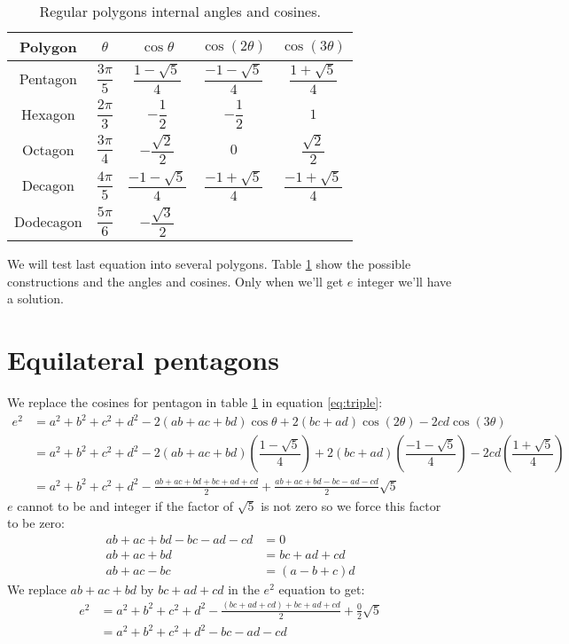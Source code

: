 \documentclass[11pt]{article}
\begin{document}
\begin{table}[h]
\centering
\begin{tabular}{|c c c c c|}\hline
Polygon & $\theta$ & $\cos\theta$ & $\cos(2\theta)$ & $\cos(3\theta)$ \rule[-2ex]{0pt}{6ex}\\ \hline\hline 
Pentagon & $\dfrac{3\pi}{5}$ & $\dfrac{1-\sqrt{5}}{4}$ & $\dfrac{-1-\sqrt{5}}{4}$ & $\dfrac{1+\sqrt{5}}{4}$\rule[-2ex]{0pt}{6ex}\\ \hline
Hexagon & $\dfrac{2\pi}{3}$ & $-\dfrac{1}{2}$ & $-\dfrac{1}{2}$ & $1$ \rule[-2ex]{0pt}{6ex}\\ \hline
Octagon & $\dfrac{3\pi}{4}$ & $-\dfrac{\sqrt{2}}{2}$ & $0$ & $\dfrac{\sqrt{2}}{2}$ \rule[-2ex]{0pt}{6ex}\\ \hline
Decagon & $\dfrac{4\pi}{5}$ & $\dfrac{-1-\sqrt{5}}{4}$ & $\dfrac{-1+\sqrt{5}}{4}$ & $\dfrac{-1+\sqrt{5}}{4}$ \rule[-2ex]{0pt}{6ex}\\ \hline
Dodecagon & $\dfrac{5\pi}{6}$ & $-\dfrac{\sqrt{3}}{2}$ &  & \rule[-2ex]{0pt}{6ex}\\ \hline

\end{tabular}
\caption{Regular polygons internal angles and cosines.}
\label{tbl:polygons}
\end{table}

We will test last equation into several polygons. Table \ref{tbl:polygons}
show the possible constructions and the angles and cosines.
Only when we'll get $e$ integer we'll have a solution.

\section{Equilateral pentagons}

We replace the cosines for pentagon in table \ref{tbl:polygons} in equation \ref{eq:triple}:
\begin{align}
e^2 &= a^2 +b^2 +c^2 +d^2 -2(ab+ac+bd)\cos\theta +2(bc+ad)\cos(2\theta) -2cd\cos(3\theta) \nonumber\\
 &= a^2 +b^2 +c^2 +d^2
  -2(ab+ac+bd)\left(\dfrac{1-\sqrt{5}}{4}\right)
  +2(bc+ad)\left(\dfrac{-1-\sqrt{5}}{4}\right)
  -2cd\left(\dfrac{1+\sqrt{5}}{4}\right) \nonumber\\
 &= a^2 +b^2 +c^2 +d^2 -\frac{ab+ac+bd+bc+ad+cd}{2} +\frac{ab+ac+bd-bc-ad-cd}{2}\sqrt{5}
\end{align}
$e$ cannot to be and integer if the factor of $\sqrt{5}$ is not zero so we force this factor to be zero:
\begin{align}
 ab+ac+bd-bc-ad-cd &= 0\nonumber\\
 ab+ac+bd &= bc+ad+cd \\
 ab+ac-bc &= (a-b+c)d
\end{align}
We replace $ab+ac+bd$ by $bc+ad+cd$ in the $e^2$ equation to get:
\begin{align}
e^2 &= a^2 +b^2 +c^2 +d^2 -\frac{(bc+ad+cd)+bc+ad+cd}{2} +\frac{0}{2}\sqrt{5} \nonumber\\
 &= a^2 +b^2 +c^2 +d^2 -bc -ad -cd
\end{align}
\end{document}

